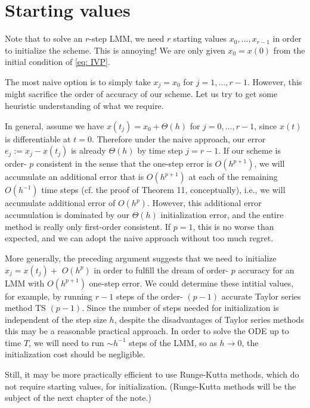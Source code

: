  \section{Starting values} 
 Note that to solve an $r$-step LMM, we need $r$ starting values $x_0, \ldots, x_{r-1}$ in order to initialize the scheme. This is annoying! We are only given $x_0=x(0)$ from the initial condition of \eqref{eq: IVP}.

 The most naive option is to simply take $x_j=x_0$ for $j=1, \ldots, r-1$. However, this might sacrifice the order of accuracy of our scheme. Let us try to get some heuristic understanding of what we require.


 In general, assume we have $x\left(t_j\right)=x_0+\Theta(h)$ for $j=0, \ldots, r-1$, since $x(t)$ is differentiable at $t=0$. Therefore under the naive approach, our error $e_j:=x_j-x\left(t_j\right)$ is already $\Theta(h)$ by time step $j=r-1$. If our scheme is order- $p$ consistent in the sense that the one-step error is $O\left(h^{p+1}\right)$, we will accumulate an additional error that is $O\left(h^{p+1}\right)$ at each of the remaining $O\left(h^{-1}\right)$ time steps (cf. the proof of Theorem 11, conceptually), i.e., we will accumulate additional error of $O\left(h^p\right)$. However, this additional error accumulation is dominated by our $\Theta(h)$ initialization error, and the entire method is really only first-order consistent. If $p=1$, this is no worse than expected, and we can adopt the naive approach without too much regret. 

 More generally, the preceding argument suggests that we need to initialize $x_j=x\left(t_j\right)+$ $O\left(h^p\right)$ in order to fulfill the dream of order- $p$ accuracy for an LMM with $O\left(h^{p+1}\right)$ one-step error. We could determine these intitial values, for example, by running $r-1$ steps of the order- $(p-1)$ accurate Taylor series method TS $(p-1)$. Since the number of steps needed for initialization is independent of the step size $h$, despite the disadvantages of Taylor series methods this may be a reasonable practical approach. In order to solve the ODE up to time $T$, we will need to run $\sim h^{-1}$ steps of the LMM, so as $h \rightarrow 0$, the initialization cost should be negligible.

 Still, it may be more practically efficient to use Runge-Kutta methods, which do not require starting values, for initialization. (Runge-Kutta methods will be the subject of the next chapter of the note.)
 